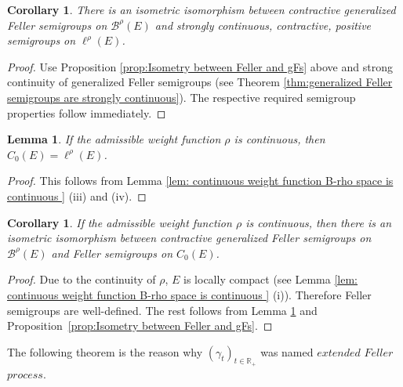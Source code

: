 \documentclass[a4paper,12pt]{article}
\newtheorem{lemma}[theorem]{Lemma}
\newtheorem{corollary}[theorem]{Corollary}
\theoremstyle{definition}
\theoremstyle{remark}
\numberwithin{equation}{section}
\numberwithin{theorem}{section}
\begin{document}
\begin{corollary}
There is an isometric isomorphism between contractive generalized
Feller semigroups on $\mathcal{\mathscr{B}}^{\rho}(E)$ and strongly
continuous, contractive, positive semigroups on $\ell^{\rho}(E)$.
\end{corollary}

\begin{proof}
Use Proposition \ref{prop:Isometry between Feller and gFs} above
and strong continuity of generalized Feller semigroups (see Theorem
\ref{thm:generalized Feller semigroups are strongly continuous}).
The respective required semigroup properties follow immediately. 
\end{proof}


\begin{lemma}
\label{lem: continuous weight function l-rho space is C_0 } If the
admissible weight function $\rho$ is continuous, then $C_{0}(E)=\ell^{\rho}(E)$. 
\end{lemma}

\begin{proof}
This follows from Lemma \ref{lem: continuous weight function B-rho space is continuous } (iii)
and (iv). 
\end{proof}
\begin{corollary}
\label{cor:isometric isomorphism Feller semigroups/contractive gFs}
If the admissible weight function $\rho$ is continuous, then there
is an isometric isomorphism between contractive generalized Feller
semigroups on $\mathcal{\mathscr{B}}^{\rho}(E)$ and 
Feller semigroups on  $C_{0}(E)$.
\end{corollary}

\begin{proof}
Due to the continuity of $\rho$, $E$ is locally compact (see Lemma \ref {lem: continuous weight function B-rho space is continuous } (i)). Therefore Feller semigroups are well-defined. The rest follows from Lemma \ref{lem: continuous weight function l-rho space is C_0 } and Proposition~\ref{prop:Isometry between Feller and gFs}.
\end{proof}

The following theorem is the reason why $\left(\gamma_{t}\right)_{t\in\mathbb{R}_{+}}$
was named $\mathit{extended}$ $\mathit{Feller}$ $\mathit{process}$.
\end{document}
